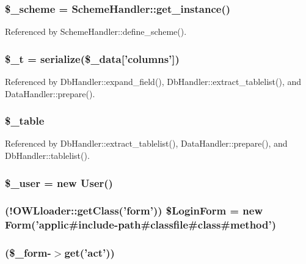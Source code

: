 \subsubsection[{\$\_\-scheme}]{\setlength{\rightskip}{0pt plus 5cm}\$\_\-scheme = SchemeHandler::get\_\-instance()}\label{index_8php_abb5321c25f21f089f5c253d5f2697502}


Referenced by SchemeHandler::define\_\-scheme().

\subsubsection[{\$\_\-t}]{\setlength{\rightskip}{0pt plus 5cm}\$\_\-t = serialize(\$\_\-data\mbox{[}'columns'\mbox{]})}\label{index_8php_a7a22c26026cc0626b015085e752b45cb}


Referenced by DbHandler::expand\_\-field(), DbHandler::extract\_\-tablelist(), and DataHandler::prepare().

\subsubsection[{\$\_\-table}]{\setlength{\rightskip}{0pt plus 5cm}\$\_\-table}\label{index_8php_ac0ee5b766d19cb282552a3449a1f8376}


Referenced by DbHandler::extract\_\-tablelist(), DataHandler::prepare(), and DbHandler::tablelist().

\subsubsection[{\$\_\-user}]{\setlength{\rightskip}{0pt plus 5cm}\$\_\-user = new {\bf User}()}\label{index_8php_a5df5982b9dadc74df05081972cd67fdf}
\subsubsection[{\$LoginForm}]{ (!OWLloader::getClass('form')) \$LoginForm = new {\bf Form}('applic\#include-\/path\#classfile\#class\#method')}\label{index_8php_ae89d28a5f6ccd73a8cb4a0253db78766}
\subsubsection[{switch}]{(\$\_\-form-\/$>$get('act'))}\label{index_8php_aa284f7d5270c1aa684d885f7bb70d532}
